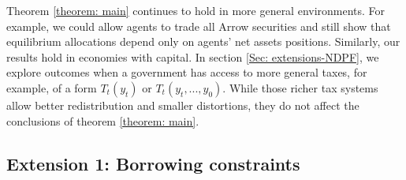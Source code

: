 \documentclass[thmsb,11pt]{article}
\begin{document}
Theorem \ref{theorem: main} continues to hold in more general environments. For example, we could allow
agents to trade all  Arrow securities and still show that  equilibrium
allocations depend only on agents' net assets positions.
Similarly, our results   hold in  economies with capital.
In section \ref{Sec: extensions-NDPF},  we explore outcomes when a government has
access to more general taxes, for example, of a form $T_{t}(y_{t})$ or $%
T_{t}(y_{t},...,y_{0})$. While those richer  tax systems  allow better redistribution and
smaller distortions, they do not affect  the conclusions of theorem \ref{theorem: main}.

\subsection{Extension 1: Borrowing constraints\label{Sec: extensions}}
%
\end{document}
